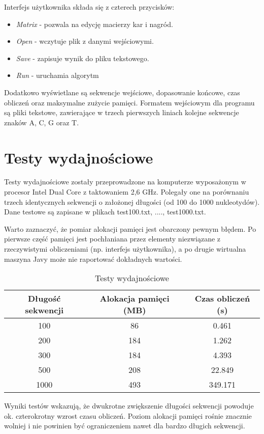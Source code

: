 \documentclass[a4paper,12pt,oneside,notitlepage,onecolumn]{article}
\begin{document}
Interfejs użytkownika składa się z czterech przycisków:
\begin{itemize}
 \item \emph{Matrix} - pozwala na edycję macierzy kar i nagród.
 \item \emph{Open} - wczytuje plik z danymi wejściowymi.
 \item \emph{Save} - zapisuje wynik do pliku tekstowego.
 \item \emph{Run} - uruchamia algorytm
\end{itemize}
Dodatkowo wyświetlane są sekwencje wejściowe, dopasowanie końcowe, czas obliczeń oraz maksymalne zużycie pamięci.
Formatem wejściowym dla programu są pliki tekstowe, zawierające w trzech pierwszych liniach kolejne sekwencje znaków A, C, G oraz T.

\section{Testy wydajnościowe}
Testy wydajnościowe zostały przeprowadzone na komputerze wyposażonym w procesor Intel Dual Core z taktowaniem 2,6 GHz.
Polegały one na porównaniu trzech identycznych sekwencji o założonej długości (od 100 do 1000 nukleotydów).
Dane testowe są zapisane w plikach test100.txt, ...., test1000.txt.

Warto zaznaczyć, że pomiar alokacji pamięci jest obarczony pewnym błędem.
Po pierwsze część pamięci jest pochłaniana przez elementy niezwiązane z rzeczywistymi obliczeniami (np. interfejs użytkownika), a
po drugie wirtualna maszyna Javy może nie raportować dokładnych wartości.

\begin{table}[t]
\caption{Testy wydajnościowe}
\begin{tabular}{|c|c|c|}
  \hline
  Długość sekwencji & Alokacja pamięci (MB) & Czas obliczeń (s)\\
  \hline
  100 & 86 & 0.461\\
  \hline
  200 & 184 & 1.262 \\
  \hline
  300 & 184 & 4.393 \\
  \hline
  500 & 208 & 22.849 \\
  \hline
  1000 & 493 & 349.171 \\
  \hline
\end{tabular} 
\end{table}

Wyniki testów wskazują, że dwukrotne zwiększenie długości sekwencji powoduje ok. czterokrotny wzrost czasu obliczeń.
Poziom alokacji pamięci rośnie znacznie wolniej i nie powinien być ograniczeniem nawet dla bardzo długich sekwencji.
\end{document}
